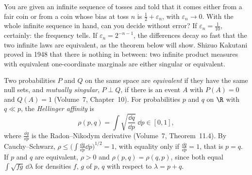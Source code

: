 You are given an infinite sequence of tosses and told that it comes either from a fair coin or from a coin whose bias at toss $n$ is $\frac12+\varepsilon_n$, with $\varepsilon_n\to0$. With the whole infinite sequence in
hand, can you decide without error? If $\varepsilon_n=\frac1{10}$, certainly: the frequency tells. If $\varepsilon_n=2^{-n-1}$, the differences decay so fast that the two infinite laws are equivalent, as the theorem below will show. Shizuo Kakutani
proved in 1948 that there is nothing in between: two infinite product measures with equivalent one-coordinate marginals are either singular or equivalent.

Two probabilities $P$ and $Q$ on the same space are \emph{equivalent} if they have the same null sets, and \emph{mutually singular}, $P\perp Q$, if there is an event $A$ with $P(A)=0$ and $Q(A)=1$ (Volume~7,
Chapter~10). For probabilities $p$ and $q$ on $\R$ with $q\ll p$, the \emph{Hellinger affinity} is
\[
\rho(p,q)=\int\sqrt{\frac{\dd q}{\dd p}}\;\dd p\in[0,1],
\]
where $\frac{\dd q}{\dd p}$ is the Radon--Nikodym derivative (Volume~7, Theorem~11.4). By Cauchy--Schwarz, $\rho\le\bigl(\int\frac{\dd q}{\dd p}\dd p\bigr)^{1/2}=1$, with equality only if $\frac{\dd q}{\dd p}=1$, that is $p=q$. If $p$ and $q$ are equivalent, $\rho>0$
and $\rho(p,q)=\rho(q,p)$, since both equal $\int\sqrt{fg}\,\dd\lambda$ for densities $f$, $g$ of $p$, $q$ with respect to $\lambda=p+q$.

